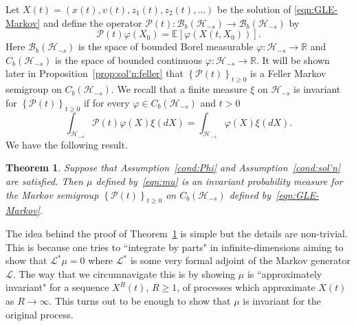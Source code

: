\documentclass[11pt]{amsart}
\theoremstyle{definition}
\newcommand{\rbb}{\mathbb{R}}
\renewcommand{\L}{\mathcal{L}}
\renewcommand{\H}{\mathcal{H}}
\newcommand{\PMarkov}{\mathcal{P}}
\newcommand{\B}{\mathcal{B}}
\newcommand{\E}[1]{\mathbb{E}\left[#1\right]}
\theoremstyle{definition}
\theoremstyle{plain}
\newtheorem{theorem}{Theorem}
\numberwithin{equation}{section}
\begin{document}
Let $X(t)=(x(t), v(t), z_1(t), z_2(t), \ldots)$ be the solution of \eqref{eqn:GLE-Markov} and define the operator $\PMarkov(t):\B_b\left(\H_{-s}\right)\to\B_b\left(\H_{-s}\right)$ by 
\begin{equation}\label{defn:Markov-semigroup}
\PMarkov(t)\varphi(X_0)=\E{\varphi(X(t,X_0))}.
\end{equation}
Here $\B_b(\H_{-s})$ is the space of bounded Borel measurable $\varphi: \H_{-s} \rightarrow \rbb$ and $C_b(\H_{-s})$ is the space of bounded continuous $\varphi: \H_{-s}\rightarrow \rbb$. It will be shown later in Proposition~\ref{prop:sol'n:feller} that $\left\{\PMarkov(t)\right\}_{t \geq 0}$ is a Feller Markov semigroup on $C_b(\H_{-s})$. We recall that a finite measure $\xi$ on $\H_{-s}$ is invariant for $\left\{\PMarkov(t)\right\}_{t \geq 0}$ if for every $\varphi\in C_b(\H_{-s})$ and $t>0$
\begin{displaymath}
\int_{\mathcal{H}_{-s}}\PMarkov(t)\varphi(X)\xi(dX)=\int_{\mathcal{H}_{-s}}\varphi(X)\xi(dX).
\end{displaymath}
We have the following result.   
\begin{theorem} \label{thm:density}
Suppose that Assumption~\ref{cond:Phi} and Assumption~\ref{cond:sol'n} are satisfied. Then $\mu$ defined by~\eqref{eqn:mu} is an invariant probability measure for the Markov semigroup $\left\{\PMarkov(t)\right\}_{t \geq 0}$ on $C_b(\H_{-s})$ defined by~\eqref{eqn:GLE-Markov}.  
\end{theorem} 
The idea behind the proof of Theorem~\ref{thm:density} is simple but the details are non-trivial.  This is because one tries to ``integrate by parts" in infinite-dimensions aiming to show that $\L^* \mu=0$ where $\L^*$ is some very formal adjoint of the Markov generator $\L$.  The way that we circumnavigate this is by showing $\mu$ is ``approximately invariant" for a sequence $X^R(t)$, $R\geq 1$, of processes which approximate $X(t)$ as $R\rightarrow \infty$.  This turns out to be enough to show that $\mu$ is invariant for the original process.       
\end{document}
